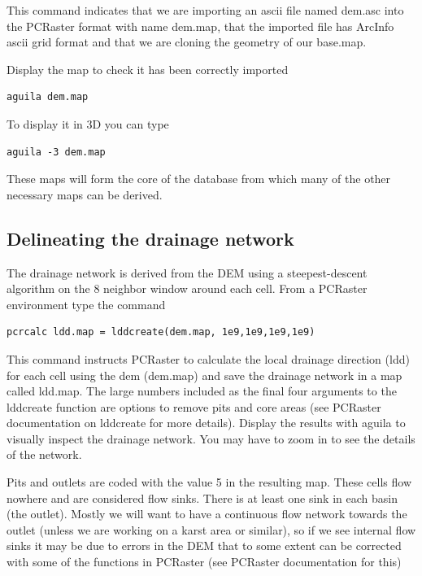 This command indicates that we are importing an ascii file named \textsf{dem.asc} into the PCRaster format with name \textsf{dem.map}, that the imported file has ArcInfo ascii grid format and that we are cloning the geometry of our base.map. 

Display the map to check it has been correctly imported

\begin{verbatim}
aguila dem.map
\end{verbatim}  
  
To display it in 3D you can type 

\begin{verbatim}
aguila -3 dem.map
\end{verbatim}

These maps will form the core of the database from which many of the other necessary maps can be derived. 

\subsection{Delineating the drainage network}

The drainage network is derived from the DEM using a steepest-descent algorithm on the 8 neighbor window around each cell. From a PCRaster environment type the command

\begin{verbatim}
pcrcalc ldd.map = lddcreate(dem.map, 1e9,1e9,1e9,1e9)
\end{verbatim}

This command instructs PCRaster to calculate the local drainage direction (ldd) for each cell using the dem (\textsf{dem.map}) and save the drainage network in a map called \textsf{ldd.map}. The large numbers included as the final four arguments to the lddcreate function are options to remove pits and core areas (see PCRaster documentation on lddcreate for more details). Display the results with aguila to visually inspect the drainage network. You may have to zoom in to see the details of the network. 

Pits and outlets are coded with the value 5 in the resulting map. These cells flow nowhere and are considered flow sinks. There is at least one sink in each basin (the outlet). Mostly we will want to have a continuous flow network towards the outlet (unless we are working on a karst area or similar), so if we see internal flow sinks it may be due to errors in the DEM that to some extent can be corrected with some of the functions in PCRaster (see PCRaster documentation for this)  

